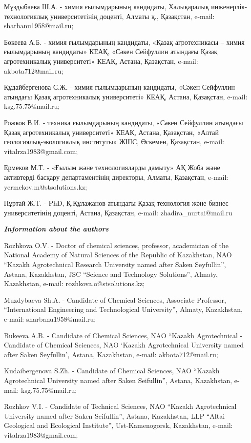 Мұздыбаева Ш.А. - химия ғылымдарының кандидаты, Халықаралық
инженерлік-технологиялық университетінің доценті, Алматы қ., Қазақстан,
e-mail: sharbanu1958@mail.ru;

Бөкеева А.Б. - химия ғылымдарының кандидаты, «Қазақ агротехникасы --
химия ғылымдарының кандидаты» КЕАҚ, «Сәкен Сейфуллин атындағы Қазақ
агротехникалық университеті» КЕАҚ, Астана, Қазақстан, e-mail:
akbota712@mail.ru;

Құдайбергенова С.Ж. - химия ғылымдарының кандидаты, «Сәкен Сейфуллин
атындағы Қазақ агротехникалық университеті» КЕАҚ, Астана, Қазақстан,
e-mail: ksg.75.75@mail.ru;

Рожков В.И. - техника ғылымдарының кандидаты, «Сәкен Сейфуллин атындағы
Қазақ агротехникалық университеті» КЕАҚ, Астана, Қазақстан, «Алтай
геологиялық-экологиялық институты» ЖШС, Өскемен, Қазақстан, e-mail:
vitalrza1983@gmail.com;

Ермеков М.Т. - «Ғылым және технологияларды дамыту» АҚ Жоба және
активтерді басқару департаментінің директоры, Алматы, Қазақстан, e-mail:
yermekov.m@stsolutions.kz;

Нұртай Ж.Т. - PhD, Қ.Құлажанов атындағы Қазақ технология және бизнес
университетінің доценті, Астана, Қазақстан, e-mail:
zhadira\_nurtai@mail.ru

\emph{\textbf{Information about the authors}}

Rozhkova O.V. - Doctor of chemical sciences, professor, academician of
the National Academy of Natural Sciences of the Republic of Kazakhstan,
NAO ``Kazakh Agrotechnical Research University named after Saken
Seyfullin'', Astana, Kazakhstan, JSC ``Science and Technology
Solutions'', Almaty, Kazakhstan, e-mail: rozhkova.o@stsolutions.kz;

Muzdybaeva Sh.A. - Candidate of Chemical Sciences, Associate Professor,
``International Engineering and Technological University'', Almaty,
Kazakhstan, e-mail: sharbanu1958@mail.ru;

Bukeeva A.B. - Candidate of Chemical Sciences, NAO ``Kazakh
Agrotechnical - Candidate of Chemical Sciences, NAO `Kazakh
Agrotechnical University named after Saken Seyfullin', Astana,
Kazakhstan, e-mail: akbota712@mail.ru;

Kudaibergenova S.Zh. - Candidate of Chemical Sciences, NAO ``Kazakh
Agrotechnical University named after Saken Seifullin'', Astana,
Kazakhstan, e-mail: ksg.75.75@mail.ru;

Rozhkov V.I. - Candidate of Technical Sciences, NAO ``Kazakh
Agrotechnical University named after Saken Seifullin'', Astana,
Kazakhstan, LLP ``Altai Geological and Ecological Institute'',
Ust-Kamenogorsk, Kazakhstan, e-mail: vitalrza1983@gmail.com;

